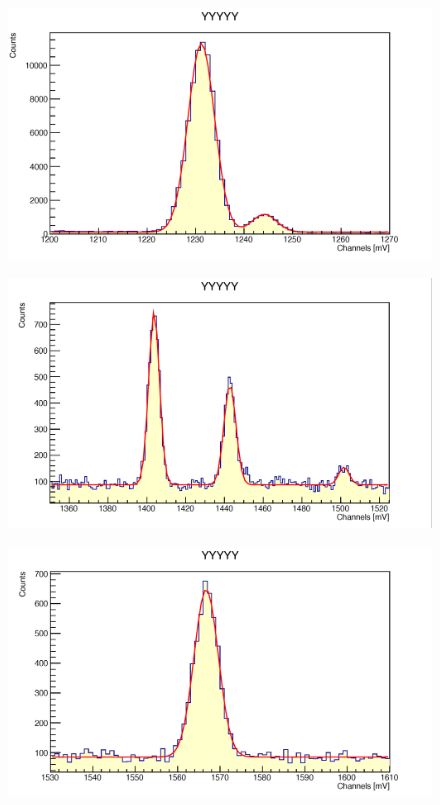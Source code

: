 \documentclass[a4paper,10pt]{article}
\begin{document}
\begin{figure}[H]
    \centering
    \includegraphics[scale=0.45]{appendice/y2}
\end{figure}
\begin{figure}[H]
    \centering
    \includegraphics[scale=0.45]{appendice/y6}
\end{figure}
\begin{figure}[H]
    \centering
    \includegraphics[scale=0.45]{appendice/y7}
\end{figure}
\end{document}
